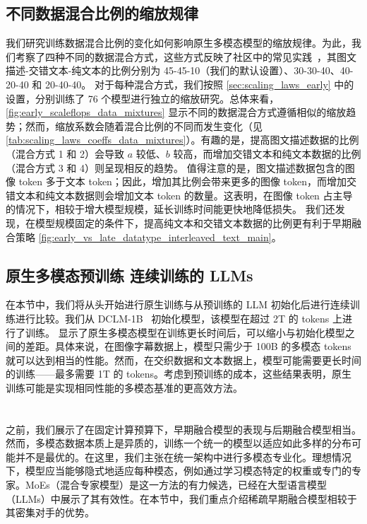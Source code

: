 \subsection{不同数据混合比例的缩放规律}  
\label{sec:scaling_data_mix}  
我们研究训练数据混合比例的变化如何影响原生多模态模型的缩放规律。为此，我们考察了四种不同的数据混合方式，这些方式反映了社区中的常见实践~\citep{laurenccon2024obelics,mckinzie2025mm1,zhang2024mm1_5,lin2024vila}，其图文描述-交错文本-纯文本的比例分别为 \colorbox{blue!10}{45-45-10}（我们的默认设置）、\colorbox{red!10}{30-30-40}、\colorbox{green!10}{40-20-40} 和 \colorbox{orange!10}{20-40-40}。  
对于每种混合方式，我们按照 \cref{sec:scaling_laws_early} 中的设置，分别训练了 76 个模型进行独立的缩放研究。总体来看，\cref{fig:early_scaleflops_data_mixtures} 显示不同的数据混合方式遵循相似的缩放趋势；然而，缩放系数会随着混合比例的不同而发生变化（见 \cref{tab:scaling_laws_coeffs_data_mixtures}）。有趣的是，提高图文描述数据的比例（混合方式 1 和 2）会导致 $a$ 较低、$b$ 较高，而增加交错文本和纯文本数据的比例（混合方式 3 和 4）则呈现相反的趋势。  
值得注意的是，图文描述数据包含的图像 token 多于文本 token；因此，增加其比例会带来更多的图像 token，而增加交错文本和纯文本数据则会增加文本 token 的数量。这表明，在图像 token 占主导的情况下，相较于增大模型规模，延长训练时间能更快地降低损失。  
我们还发现，在模型规模固定的条件下，提高纯文本和交错文本数据的比例更有利于早期融合策略 \cref{fig:early_vs_late_datatype_interleaved_text_main}。
\subsection{原生多模态预训练 \textbf{\vs} 连续训练的 LLMs}
\label{sec:native_vs_continual}
在本节中，我们将从头开始进行原生训练与从预训练的 LLM 初始化后进行连续训练进行比较。我们从 DCLM-1B~\citep{fang2023data} 初始化模型，该模型在超过 2T 的 tokens 上进行了训练。  显示了原生多模态模型在训练更长时间后，可以缩小与初始化模型之间的差距。具体来说，在图像字幕数据上，模型只需少于 100B 的多模态 tokens 就可以达到相当的性能。然而，在交织数据和文本数据上，模型可能需要更长时间的训练——最多需要 1T 的 tokens。考虑到预训练的成本，这些结果表明，原生训练可能是实现相同性能的多模态基准的更高效方法。


\section{}

之前，我们展示了在固定计算预算下，早期融合模型的表现与后期融合模型相当。然而，多模态数据本质上是异质的，训练一个统一的模型以适应如此多样的分布可能并不是最优的。在这里，我们主张在统一架构中进行多模态专业化。理想情况下，模型应当能够隐式地适应每种模态，例如通过学习模态特定的权重或专门的专家。MoEs（混合专家模型）是这一方法的有力候选，已经在大型语言模型（LLMs）中展示了其有效性。在本节中，我们重点介绍稀疏早期融合模型相较于其密集对手的优势。

